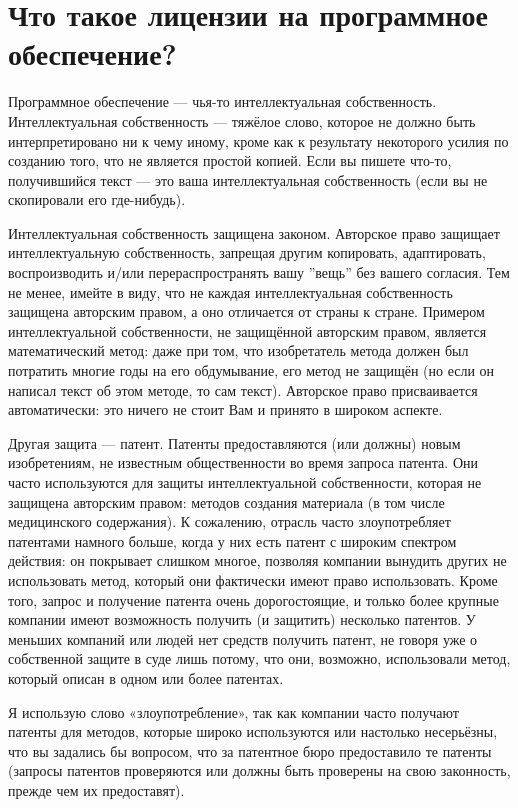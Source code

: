 \documentclass[12pt]{book}
\begin{document}
\section{Что такое лицензии на программное обеспечение?}

Программное обеспечение --- чья-то интеллектуальная собственность. Интеллектуальная собственность --- тяжёлое слово, которое не должно быть интерпретировано ни к чему иному, кроме как к результату некоторого усилия по созданию того, что не является простой копией. Если вы пишете что-то, получившийся текст — это ваша интеллектуальная собственность (если вы не скопировали его где-нибудь).

Интеллектуальная собственность защищена законом. Авторское право защищает  интеллектуальную собственность, запрещая другим копировать, адаптировать, воспроизводить и/или перераспространять вашу ''вещь'' без вашего согласия. Тем не менее, имейте в виду, что не каждая интеллектуальная собственность защищена авторским правом, а оно отличается от страны к стране. Примером интеллектуальной собственности,  не защищённой авторским правом, является математический метод: даже при том, что изобретатель метода должен был потратить многие годы на его обдумывание, его метод не защищён (но если он написал текст об этом методе, то сам текст). Авторское право присваивается автоматически: это ничего не стоит Вам и принято в широком аспекте.

Другая защита --- патент. Патенты предоставляются (или должны) новым изобретениям,  не известным общественности во время запроса патента. Они часто используются для защиты интеллектуальной собственности, которая не защищена авторским правом: методов создания материала (в том числе медицинского содержания). К сожалению, отрасль часто злоупотребляет патентами намного больше, когда у них есть патент с широким спектром действия: он покрывает слишком многое, позволяя компании вынудить других не использовать метод, который они фактически имеют право использовать. Кроме того,  запрос и получение патента очень дорогостоящие, и только более крупные компании имеют возможность получить (и защитить) несколько патентов. У меньших компаний или людей нет средств получить патент, не говоря уже о собственной защите в суде лишь потому, что они, возможно, использовали метод, который описан в одном или более патентах.

Я использую слово «злоупотребление», так как компании часто получают патенты для методов, которые широко используются или настолько несерьёзны, что вы задались бы вопросом,  что за патентное бюро предоставило те патенты (запросы патентов проверяются или должны быть проверены на свою законность, прежде чем их предоставят).
\end{document}
